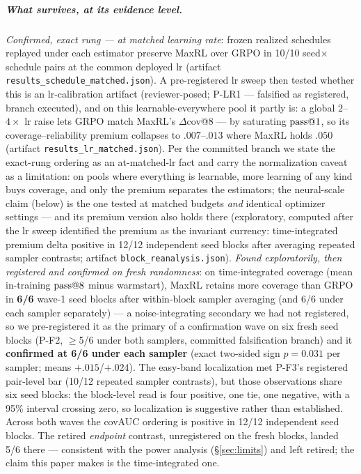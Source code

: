 \subparagraph{What survives, at its evidence level.}
\emph{Confirmed, exact rung --- at matched learning rate}: frozen
realized schedules replayed under each estimator preserve MaxRL over
GRPO in 10/10 seed$\times$schedule pairs at the common deployed lr
(artifact \texttt{results\_schedule\_matched.json}). A pre-registered
lr sweep then tested whether this is an lr-calibration artifact
(reviewer-posed; P-LR1 --- falsified as registered, branch
executed), and on this learnable-everywhere pool it partly is: a global $2$--$4\times$ lr
raise lets GRPO match MaxRL's $\Delta$cov@8 --- by saturating
$\text{pass@}1$, so its coverage--reliability premium collapses to
$.007$--$.013$ where MaxRL holds $.050$ (artifact
\texttt{results\_lr\_matched.json}). Per the committed branch we
state the exact-rung ordering as an at-matched-lr fact and carry the
normalization caveat as a limitation: on pools where everything is
learnable, more learning of any kind buys coverage, and only the
premium separates the estimators; the neural-scale claim (below) is
the one tested at matched budgets \emph{and} identical optimizer
settings --- and its premium version also holds there (exploratory,
computed after the lr sweep identified the premium as the invariant
currency: time-integrated premium delta positive in 12/12 independent
seed blocks after averaging repeated sampler contrasts; artifact
\texttt{block\_reanalysis.json}). \emph{Found exploratorily, then registered
and confirmed on fresh randomness}: on time-integrated coverage (mean
in-training $\text{pass@}8$ minus warmstart), MaxRL retains more coverage
than GRPO in \textbf{6/6} wave-1 seed blocks after within-block
sampler averaging (and 6/6 under each sampler separately) --- a
noise-integrating secondary we had not registered, so we
pre-registered it as the primary of a confirmation wave on six fresh
seed blocks (P-F2, $\ge$5/6 under both samplers, committed
falsification branch) and it \textbf{confirmed at 6/6 under each
sampler} (exact two-sided sign $p{=}0.031$ per sampler; means
$+.015$/$+.024$). The easy-band localization met P-F3's registered
pair-level bar (10/12 repeated sampler contrasts), but those observations
share six seed blocks: the block-level read is four positive, one tie,
one negative, with a 95\% interval crossing zero, so localization is
suggestive rather than established. Across both waves the covAUC
ordering is positive in 12/12 independent seed blocks. The retired \emph{endpoint}
contrast, unregistered on the fresh blocks, landed 5/6 there ---
consistent with the power analysis (\S\ref{sec:limits}) and left
retired; the claim this paper makes is the time-integrated one.

